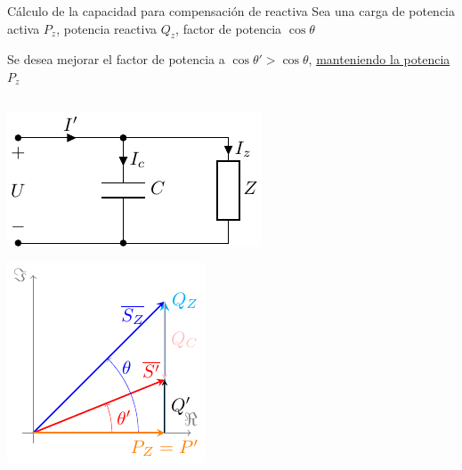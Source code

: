 \documentclass[aspectratio=169, usenames,svgnames,dvipsnames]{beamer}
\begin{document}
\begin{frame}{Cálculo de la capacidad para compensación de reactiva}
    \vspace{2mm}
    Sea una carga de potencia activa \(P_z\), potencia reactiva \(Q_z\), factor de potencia \(\cos\theta\) 

    \vspace{-1mm}
    Se desea \alert{mejorar el factor de potencia} a \(\cos \theta' > \cos \theta\), 
    \href{https://raw.githubusercontent.com/ETSIDI-IE/tc/master/docs/ejercicios_clase/TC1_02_conexion_paralelo_reactiva.pdf}{manteniendo la potencia \(P_z\)} 

    \vspace{-4mm}
    \begin{columns}
    \begin{column}{0.4\linewidth}
        \begin{center}
            \includegraphics[width=0.9\linewidth]{../figs/circuitocompensacionreactiva.pdf}
        \end{center}

        \vspace{-5mm}
        \begin{center}
            \includegraphics[width=0.6\linewidth]{../figs/trianguloCompensacionQ.pdf}
        \end{center}
    \end{column}
    \begin{column}{0.6\linewidth}


\end{column}
\end{columns}
\end{frame}
\end{document}
